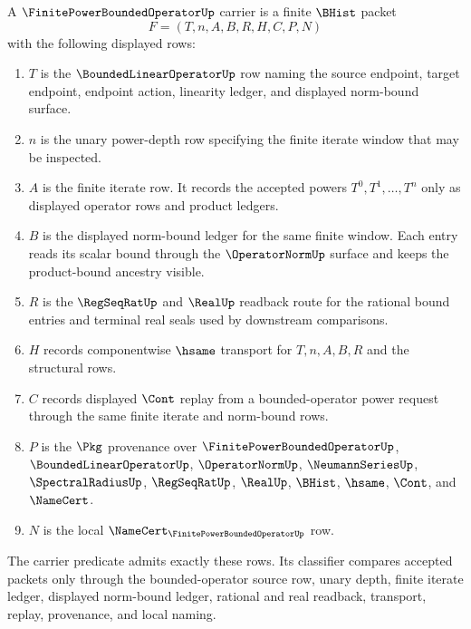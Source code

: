 \begin{definition}
\label{def:spectral-radius-finite-power-carrier}
A $\FinitePowerBoundedOperatorUp$ carrier is a finite $\BHist$ packet
$$
F=(T,n,A,B,R,H,C,P,N)
$$
with the following displayed rows:
\begin{enumerate}
\item $T$ is the $\BoundedLinearOperatorUp$ row naming the source endpoint, target endpoint, endpoint action, linearity ledger, and displayed norm-bound surface.
\item $n$ is the unary power-depth row specifying the finite iterate window that may be inspected.
\item $A$ is the finite iterate row. It records the accepted powers $T^0,T^1,\ldots,T^n$ only as displayed operator rows and product ledgers.
\item $B$ is the displayed norm-bound ledger for the same finite window. Each entry reads its scalar bound through the $\OperatorNormUp$ surface and keeps the product-bound ancestry visible.
\item $R$ is the $\RegSeqRatUp$ and $\RealUp$ readback route for the rational bound entries and terminal real seals used by downstream comparisons.
\item $H$ records componentwise $\hsame$ transport for $T,n,A,B,R$ and the structural rows.
\item $C$ records displayed $\Cont$ replay from a bounded-operator power request through the same finite iterate and norm-bound rows.
\item $P$ is the $\Pkg$ provenance over $\FinitePowerBoundedOperatorUp$, $\BoundedLinearOperatorUp$, $\OperatorNormUp$, $\NeumannSeriesUp$, $\SpectralRadiusUp$, $\RegSeqRatUp$, $\RealUp$, $\BHist$, $\hsame$, $\Cont$, and $\NameCert$.
\item $N$ is the local $\NameCert_{\FinitePowerBoundedOperatorUp}$ row.
\end{enumerate}
The carrier predicate admits exactly these rows. Its classifier compares accepted packets only through the bounded-operator source row, unary depth, finite iterate ledger, displayed norm-bound ledger, rational and real readback, transport, replay, provenance, and local naming.
\end{definition}

